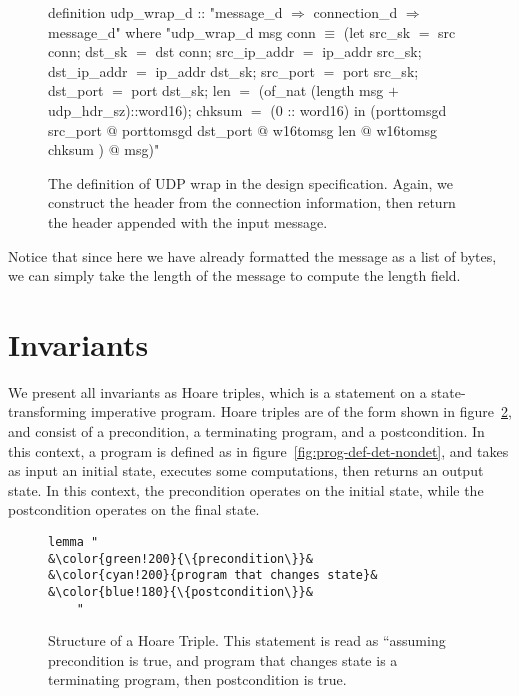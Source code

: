 \documentclass[twoside]{memoir}
\begin{document}
\begin{figure}[htpb]
    \centering
\begin{nlisting}[language=isabelle]
definition udp_wrap_d :: "message_d $\Rightarrow$ connection_d $\Rightarrow$ message_d"
where "udp_wrap_d msg conn $\equiv$ (let
                            src_sk $=$ src conn;
                            dst_sk $=$ dst conn;
                            src_ip_addr $=$ ip_addr src_sk;
                            dst_ip_addr $=$ ip_addr dst_sk;
                            src_port $=$ port src_sk;
                            dst_port $=$ port dst_sk;
                            len $=$ (of_nat
                        (length msg $+$ udp_hdr_sz)::word16);
                            chksum $=$ (0 :: word16)
                          in
                            (porttomsgd src_port $@$
                             porttomsgd dst_port $@$
                             w16tomsg len $@$
                             w16tomsg chksum
                            ) $@$ msg)"


\end{nlisting}
    \caption{The definition of UDP wrap in the design specification.
        Again, we construct the header from the connection information,
        then return the header appended with the input message.
    }
    \label{fig:wrap-design}
\end{figure}

Notice that since here we have already formatted the message as
a list of bytes, we can simply take the length of the message
to compute the length field.



\section{Invariants}
We present all invariants as Hoare triples, which is a 
statement on a state-transforming imperative program.
Hoare triples are of the form shown in figure~\ref{fig:hoare-triple-structure},
and consist of a precondition, a terminating program, and a postcondition.
In this context, a program is defined as in figure~\ref{fig:prog-def-det-nondet},
and takes as input an initial state, executes some computations, then returns
an output state.
In this context, the precondition operates on the initial state, while the 
postcondition operates on the final state.

\begin{figure}[htpb]
    \centering
\begin{lstlisting}[language=isabelle]
lemma "
&\color{green!200}{\{precondition\}}&
&\color{cyan!200}{program that changes state}&
&\color{blue!180}{\{postcondition\}}&
    "
\end{lstlisting}
    
    \caption{Structure of a Hoare Triple.
        This statement is read as
        ``assuming {\color{green!200}precondition} is true,
        and {\color{cyan!200}program that changes state} is a terminating
        program, then {\color{blue!180}postcondition} is true.
        }
    \label{fig:hoare-triple-structure}
\end{figure}
\end{document}
